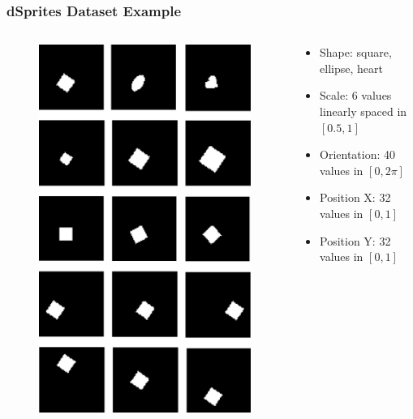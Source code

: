 \documentclass[10pt,mathserif]{beamer}
\begin{document}
\begin{frame}
\frametitle{dSprites Dataset Example}
\begin{columns}
\begin{column}{0.35\textwidth}
\begin{figure}
\includegraphics[width=\linewidth]{dsprites}
\end{figure}
\end{column}
\begin{column}{0.65\textwidth}
\begin{itemize}\itemsep=26pt
\item Shape: square, ellipse, heart{\color{red}{(discrete)}}
\item Scale: 6 values linearly spaced in $[0.5, 1]$
\item Orientation: 40 values in $[0, 2\pi]$
\item Position X: 32 values in $[0, 1]$
\item Position Y: 32 values in $[0, 1]$

\end{itemize}
\end{column}
\end{columns}

\end{frame}
\end{document}
